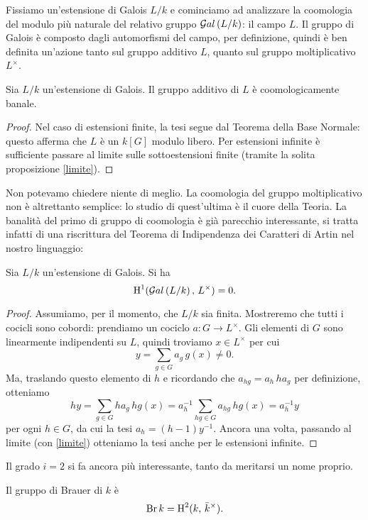 Fissiamo un'estensione di Galois $ L/k $ e cominciamo ad analizzare la coomologia del modulo più naturale del relativo gruppo $ \mathcal{G}al\left( L/k \right) $: il campo $ L $. Il gruppo di Galois è composto dagli automorfismi del campo, per definizione, quindi è ben definita un'azione tanto sul gruppo additivo $ L $, quanto sul gruppo moltiplicativo $ L^\times $.

\begin{theorem} \label{Hadd}
	Sia $ L / k $ un'estensione di Galois. Il gruppo additivo di $ L $ è coomologicamente banale.
\end{theorem}
\begin{proof}
	Nel caso di estensioni finite, la tesi segue dal Teorema della Base Normale: questo afferma che $ L $ è un $ k[G] $ modulo libero. Per estensioni infinite è sufficiente passare al limite sulle sottoestensioni finite (tramite la solita proposizione \ref{limite}).
\end{proof}

Non potevamo chiedere niente di meglio. La coomologia del gruppo moltiplicativo non è altrettanto semplice: lo studio di quest'ultima è il cuore della Teoria. La banalità del primo di gruppo di coomologia è già parecchio interessante, si tratta infatti di una riscrittura del Teorema di Indipendenza dei Caratteri di Artin nel nostro linguaggio:

\begin{theorem}[Hilbert 90]\label{H90}
	Sia $ L/k $ un'estensione di Galois. Si ha
	\[ \operatorname{H}^1(\mathcal{G}al\left(  L / k \right), \, L^\times) = 0. \]
\end{theorem}
\begin{proof}
	Assumiamo, per il momento, che $ L/k $ sia finita. Mostreremo che tutti i cocicli sono cobordi: prendiamo un cociclo $ a \colon G \to L^\times $. Gli elementi di $ G $ sono linearmente indipendenti su $ L $, quindi troviamo $ x \in L^\times $ per cui
	\[ y = \sum_{g \in G} a_g \, g(x) \neq 0. \]
	Ma, traslando questo elemento di $ h $ e ricordando che $ a_{hg} = a_h \, ha_g $ per definizione, otteniamo $$  hy = \sum_{g \in G} ha_g  \, hg(x)  = a_h^{-1} \sum_{hg \in G} a_{hg} \,  hg(x) = a_h^{-1}y  $$ per ogni $ h \in G $, da cui la tesi $ a_h = (h-1)y^{-1} $.
	Ancora una volta, passando al limite (con \ref{limite}) otteniamo la tesi anche per le estensioni infinite.
\end{proof}

Il grado $ i = 2 $ si fa ancora più interessante, tanto da meritarsi un nome proprio.
\begin{definition}
	Il gruppo di Brauer di $ k $ è $$  \operatorname{Br} k = \operatorname{H}^2(k, \, \bar{k}^\times).  $$
\end{definition}

